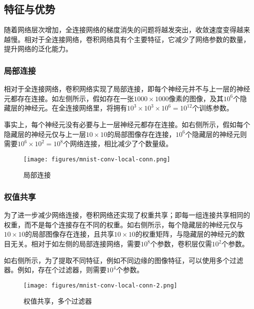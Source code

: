 \begin{content}

\subsection{特征与优势}

随着网络层次增加，全连接网络的梯度消失的问题将越发突出，收敛速度变得越来越慢。相对于全连接网络，卷积网络具有个主要特征，它减少了网络参数的数量，提升网络的泛化能力。

\subsubsection{局部连接}

相对于全连接网络，卷积网络实现了局部连接，即每个神经元并不与上一层的神经元都存在连接。如左侧所示，假如存在一张$ 1000 \times 1000 $像素的图像，及其$ 10^6 $个隐藏层的神经元。在全连接网络里，将拥有$ 10^3 \times 10^3 \times 10^6 = 10^{12} $个训练参数。

事实上，每个神经元没有必要与上一层神经元都存在连接。如右侧所示，假如每个隐藏层的神经元仅与上一层$ 10 \times 10 $的局部图像存在连接，$ 10^6 $个隐藏层的神经元则需要$ 10^6 \times 10^2 = 10^8$个网络连接，相比减少了个数量级。

\begin{figure}[H]
\centering
\texttt{[image: figures/mnist-conv-local-conn.png]}
\caption{局部连接}
 \label{fig:mnist-conv-local-conn}
\end{figure}

\subsubsection{权值共享}

为了进一步减少网络连接，卷积网络还实现了权重共享；即每一组连接共享相同的权重，而不是每个连接存在不同的权重。如右侧所示，每个隐藏层的神经元仅与$ 10 \times 10 $的局部图像存在连接，且共享$ 10 \times 10 $的权重矩阵，与隐藏层的神经元的数目无关。相对于如左侧的局部连接网络，需要$10^8$个参数，卷积层仅需$10^2$个参数。

如右侧所示，为了提取不同特征，例如不同边缘的图像特征，可以使用多个过滤器。例如，存在个过滤器，则需要$10^4$个参数。

\begin{figure}[H]
\centering
\texttt{[image: figures/mnist-conv-local-conn-2.png]}
\caption{权值共享，多个过滤器}
 \label{fig:mnist-conv-local-conn-2}
\end{figure}


\end{content}
